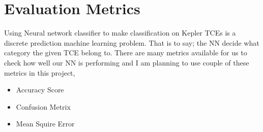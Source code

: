 \chapter{Evaluation Metrics}

Using Neural network classifier to make classification on Kepler TCEs is a discrete prediction machine learning problem. That is to say; the NN decide what category the given TCE belong to. There are many metrics available for us to check how well our NN is performing and I am planning to use couple of these metrics in this project, 

\begin{itemize}
  \item Accuracy Score
  \item Confusion Metrix
\item Mean Squire Error 
\end{itemize}
 

 

